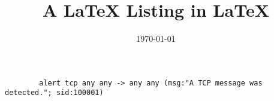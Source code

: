 \documentclass{article}
\begin{document}
    
    \title{A LaTeX Listing in \LaTeX}
    \date{\today}
    \maketitle
    
    \begin{lstlisting}
	    alert tcp any any -> any any (msg:"A TCP message was detected."; sid:100001)
    \end{lstlisting}
    
	
\end{document}
